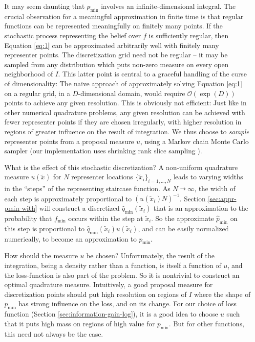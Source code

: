 \documentclass[twoside,11pt]{article}
\newcommand{\pmin}{p_{\min}}
\newcommand{\fmin}{f_{\min}}
\newcommand{\hpmin}{\hat{p}_{\min}}
\newcommand{\hqmin}{\hat{q}_{\min}}
\renewcommand{\O}{\mathcal{O}}
\renewcommand{\to}{\rightarrowtriangle}
\begin{document}
It may seem daunting that $\pmin$ involves an infinite-dimensional
integral. The crucial observation for a meaningful approximation in
finite time is that regular functions can be represented meaningfully
on finitely many points. If the stochastic process representing the
belief over $f$ is sufficiently regular, then Equation \eqref{eq:1}
can be approximated arbitrarily well with finitely many representer
points. The discretization grid need not be regular -- it may be
sampled from any distribution which puts non-zero measure on every
open neighborhood of $I$. This latter point is central to a graceful
handling of the curse of dimensionality: The na\"ive approach of
approximately solving Equation \eqref{eq:1} on a regular grid, in a
$D$-dimensional domain, would require $\O(\exp(D))$ points to achieve
any given resolution. This is obviously not efficient: Just like in
other numerical quadrature problems, any given resolution can be
achieved with fewer representer points if they are chosen irregularly,
with higher resolution in regions of greater influence on the result
of integration. We thus choose to \emph{sample} representer points
from a proposal measure $u$, using a Markov chain Monte Carlo sampler
(our implementation uses shrinking rank slice sampling
\citep{thompson2010slice}).

What is the effect of this stochastic discretization? A non-uniform
quadrature measure $u(\tilde{x})$ for $N$ representer locations
$\{\tilde{x}_i\}_{i=1,\dots,N}$ leads to varying widths in the
``steps'' of the representing staircase function. As $N\to\infty$, the
width of each step is approximately proportional to $(u(\tilde{x}_i)
N)^{-1}$. Section \ref{sec:appr-pmin-with} will construct a
discretized $\hqmin(\tilde{x}_i)$ that is an approximation to the
probability that $\fmin$ occurs within the step at $\tilde{x}_i$. So
the approximate $\hpmin$ on this step is proportional to
$\hqmin(\tilde{x}_i) u(\tilde{x}_i)$, and can be easily normalized
numerically, to become an approximation to $\pmin$.

How should the measure $u$ be chosen? Unfortunately, the result of the
integration, being a density rather than a function, is itself a
function of $u$, and the loss-function is also part of the
problem. So it is nontrivial to construct an optimal quadrature
measure. Intuitively, a good proposal measure for discretization
points should put high resolution on regions of $I$ where the shape of
$\pmin$ has strong influence on the loss, and on its change. For our
choice of loss function (Section \ref{sec:information-gain-log}), it
is a good idea to choose $u$ such that it puts high mass on regions of
high value for $\pmin$. But for other functions, this need not always
be the case.
\end{document}
